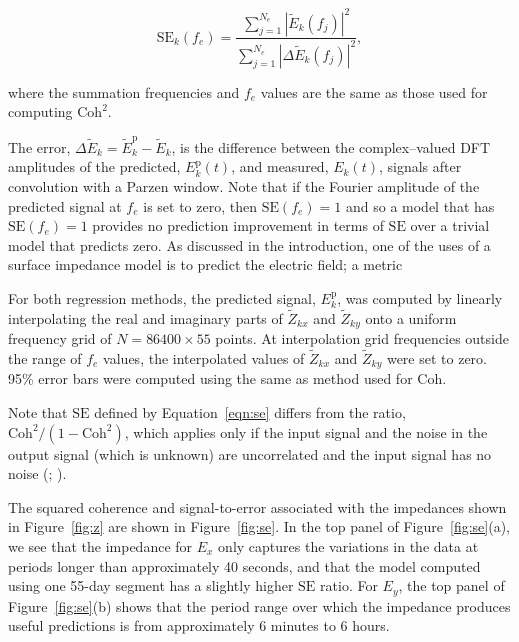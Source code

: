 \documentclass[pdflatex,sn-basic]{sn-jnl}%
\begin{document}
\begin{equation}
\text{SE}_k(f_e) = \frac{\displaystyle\sum_{j=1}^{N_e} \left|\widetilde{E}_k(f_j)\right|^2}{\displaystyle\sum_{j=1}^{N_e}\left|\Delta\widetilde{E}_k(f_j)\right|^2},
\label{eqn:se}
\end{equation}

\noindent where the summation frequencies and $f_e$ values are the same as those used for computing $\text{Coh}^2$.

The error, $\Delta\widetilde{E}_k = \widetilde{E}_k^{\text{p}}-\widetilde{E}_k$, is the difference between the complex--valued DFT amplitudes of the predicted, $E_k^\text{p}(t)$, and measured, $E_k(t)$, signals after convolution with a Parzen window. Note that if the Fourier amplitude of the predicted signal at $f_e$ is set to zero, then $\text{SE}(f_e)=1$ and so a model that has $\text{SE}(f_e)=1$ provides no prediction improvement in terms of $\text{SE}$ over a trivial model that predicts zero. As discussed in the introduction, one of the uses of a surface impedance model is to predict the electric field; a metric 

For both regression methods, the predicted signal, $E_k^{\text{p}}$, was computed by linearly interpolating the real and imaginary parts of $\widetilde{Z}_{kx}$ and $\widetilde{Z}_{ky}$ onto a uniform frequency grid of $N=86400\times 55$ points. At interpolation grid frequencies outside the range of $f_e$ values, the interpolated values of $\widetilde{Z}_{kx}$ and $\widetilde{Z}_{ky}$ were set to zero. 95\% error bars were computed using the same as method used for $\text{Coh}$.

Note that $\text{SE}$ defined by Equation~\ref{eqn:se} differs from the ratio, $\text{Coh}^2/(1-\text{Coh}^2)$, which applies only if the input signal and the noise in the output signal (which is unknown) are uncorrelated and the input signal has no noise (\cite{Miranda2006}; \cite{Pedersen1988}).

The squared coherence and signal-to-error associated with the impedances shown in Figure~\ref{fig:z} are shown in Figure~\ref{fig:se}. In the top panel of Figure~\ref{fig:se}(a), we see that the impedance for $E_x$ only captures the variations in the data at periods longer than approximately 40 seconds, and that the model computed using one 55-day segment has a slightly higher $\text{SE}$ ratio. For $E_y$, the top panel of Figure~\ref{fig:se}(b) shows that the period range over which the impedance produces useful predictions is from approximately 6 minutes to 6 hours.
\end{document}

